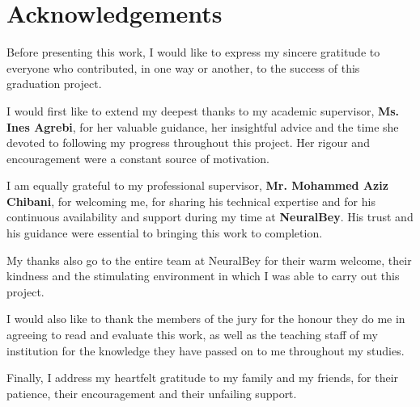 \chapter*{\huge Acknowledgements}
\vspace{8mm}

Before presenting this work, I would like to express my sincere gratitude
to everyone who contributed, in one way or another, to the success of this
graduation project.

I would first like to extend my deepest thanks to my academic supervisor,
\textbf{Ms. Ines Agrebi}, for her valuable guidance, her insightful advice
and the time she devoted to following my progress throughout this project.
Her rigour and encouragement were a constant source of motivation.

I am equally grateful to my professional supervisor, \textbf{Mr. Mohammed
Aziz Chibani}, for welcoming me, for sharing his technical expertise and
for his continuous availability and support during my time at
\textbf{NeuralBey}. His trust and his guidance were essential to bringing
this work to completion.

My thanks also go to the entire team at NeuralBey for their warm welcome,
their kindness and the stimulating environment in which I was able to
carry out this project.

I would also like to thank the members of the jury for the honour they do
me in agreeing to read and evaluate this work, as well as the teaching
staff of my institution for the knowledge they have passed on to me
throughout my studies.

Finally, I address my heartfelt gratitude to my family and my friends, for
their patience, their encouragement and their unfailing support.
